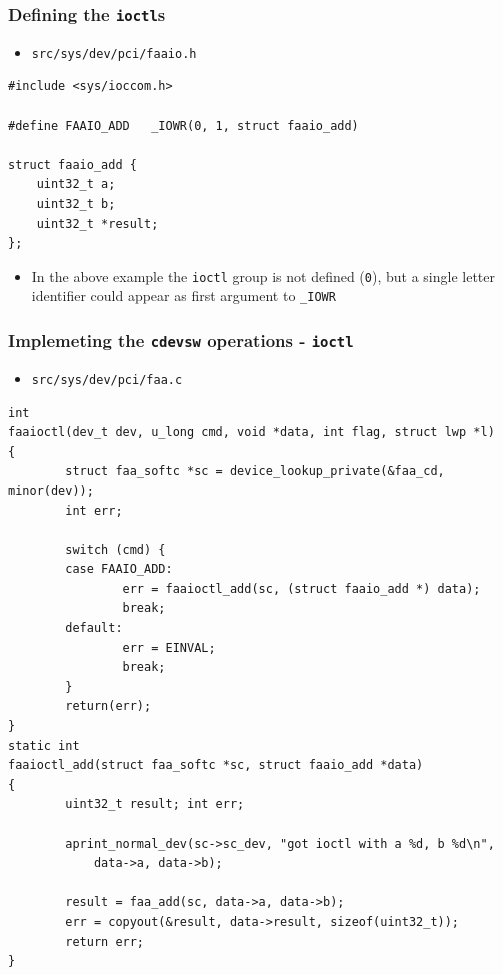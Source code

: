 \documentclass[dvipsnames,table]{beamer}
\begin{document}
\begin{frame}[fragile]
\frametitle{Defining the {\tt ioctl}s}
\begin{itemize}
\item {\tt src/sys/dev/pci/faaio.h}
\end{itemize}
\begin{lstlisting}
#include <sys/ioccom.h>
                     
#define FAAIO_ADD	_IOWR(0, 1, struct faaio_add)

struct faaio_add {
    uint32_t a;
    uint32_t b;
    uint32_t *result;
};
\end{lstlisting}
\begin{itemize}
	\item In the above example the {\tt ioctl} group is not defined ({\tt0}), but a single letter identifier could appear as first argument to {\tt\_IOWR}
\end{itemize}
\end{frame}

\begin{frame}[fragile]
\frametitle{Implemeting the {\tt cdevsw} operations - {\tt ioctl}}
\begin{itemize}
	\item {\tt src/sys/dev/pci/faa.c}
\end{itemize}
\begin{lstlisting}
int
faaioctl(dev_t dev, u_long cmd, void *data, int flag, struct lwp *l)
{
        struct faa_softc *sc = device_lookup_private(&faa_cd, minor(dev));
        int err;

        switch (cmd) {
        case FAAIO_ADD:
                err = faaioctl_add(sc, (struct faaio_add *) data);
                break;
        default:
                err = EINVAL;
                break;
        }
        return(err);
}
static int
faaioctl_add(struct faa_softc *sc, struct faaio_add *data)
{
        uint32_t result; int err;

        aprint_normal_dev(sc->sc_dev, "got ioctl with a %d, b %d\n",
            data->a, data->b);

        result = faa_add(sc, data->a, data->b);
        err = copyout(&result, data->result, sizeof(uint32_t));
        return err;
}
\end{lstlisting}
\end{frame}
\end{document}
